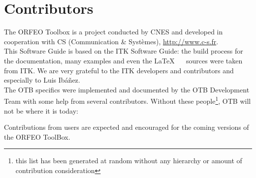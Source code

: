 \chapter{Contributors}
\noindent

The ORFEO Toolbox is a project conducted by CNES and developed in
cooperation with CS (Communication \& Syst\`{e}mes), \url{http://www.c-s.fr}.\\

This Software Guide is based on the ITK Software Guide: the build
process for the documentation, many examples and even the \LaTeX~ ~
sources were taken from ITK. We are very grateful to the ITK
developers and contributors and especially to Luis Ib\'a\~nez.\\

The OTB specifics were implemented and documented by the OTB Development Team with some help from several contributors. Without these people\footnote{this list has been generated at random without any hierarchy or amount of contribution consideration}, OTB will not be where it is today:



Contributions from users are expected and encouraged for the coming
versions of the ORFEO ToolBox.

